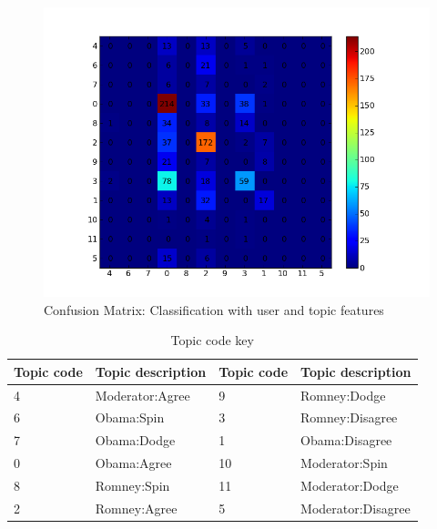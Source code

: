 \begin{figure}[H]
	\centering
	\includegraphics[scale=0.5]{Figures/boydstun_confusion.png}
	\caption{Confusion Matrix: Classification with user and topic features}
	\label{fig:boydstunconfusion}
\end{figure}


\begin{table}[H]
\begin{centering}
\begin{tabular}{ l | l | l | l }
 Topic code & Topic description & Topic code & Topic description \\
\hline
4 & Moderator:Agree & 9 & Romney:Dodge \\
6 & Obama:Spin & 3 & Romney:Disagree \\
7 & Obama:Dodge & 1 & Obama:Disagree \\
0 & Obama:Agree & 10 & Moderator:Spin \\
8 & Romney:Spin & 11 & Moderator:Dodge \\
2 & Romney:Agree & 5 & Moderator:Disagree \\

\end{tabular}
\caption{Topic code key}
\end{centering}
\end{table}
